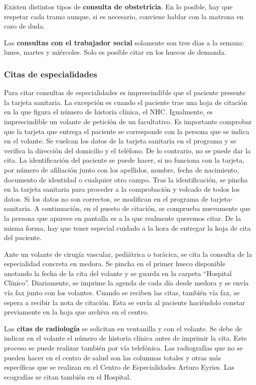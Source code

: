 Existen distintos tipos de \textbf{consulta de obstetricia}.
En lo posible, hay que respetar cada tramo aunque, si es necesario, conviene hablar con la \gls{matrona} en caso de duda.

Las \textbf{consultas con el trabajador social} solamente son tres días a la semana: lunes, martes y miércoles.
Solo es posible citar en los huecos de demanda.

\subsubsection{Citas de especialidades}

Para citar consultas de especialidades es imprescindible que el paciente presente la tarjeta sanitaria.
La excepción es cuando el paciente trae una hoja de citación en la que figura el número de historia clínica, el NHC.
Igualmente, es imprescindible un \gls{volante} de petición de un facultativo.
Es importante comprobar que la tarjeta que entrega el paciente se corresponde con la persona que se indica en el \gls{volante}.
Se vuelcan los datos de la tarjeta sanitaria en el programa y se verifica la dirección del domicilio y el teléfono. De lo contrario, no se puede dar la cita.
La identificación del paciente se puede hacer, si no funciona con la tarjeta, por número de afiliación junto con los apellidos, nombre, fecha de nacimiento, documento de identidad o cualquier otro campo.
Tras la identificación, se pincha en la tarjeta sanitaria para proceder a la comprobación y volcado de todos los datos.
Si los datos no son correctos, se modifican en el programa de \Gls{tarjeta-sanitaria}.
A continuación, en el puesto de citación, se comprueba nuevamente que la persona que aparece en pantalla es a la que realmente queremos citar.
De la misma forma, hay que tener especial cuidado a la hora de entregar la hoja de cita del paciente.

Ante un \gls{volante} de cirugía vascular, pediátrica o torácica, se cita la consulta de la especialidad concreta en \Gls{medora}.
Se pincha en el primer hueco disponible anotando la fecha de la cita del \gls{volante} y se guarda en la carpeta ``Hospital Clínico''.
Diariamente, se imprime la agenda de cada día desde \Gls{medora} y se envía vía fax junto con los volantes.
Cuando se reciben las citas, también vía fax, se espera a recibir la nota de citación.
Esta se envía al paciente haciéndolo constar previamente en la hoja que archiva en el centro.

Las \textbf{citas de radiología} se solicitan en ventanilla y con el \gls{volante}.
Se debe de indicar en el \gls{volante} el número de historia clínica antes de imprimir la cita.
Este proceso se puede realizar también por vía telefónica.
Las radiografías que no se pueden hacer en el centro de salud son las columnas totales y otras más específicas que se realizan en el Centro de Especialidades Arturo Eyries.
Las ecografías se citan también en el Hospital.

